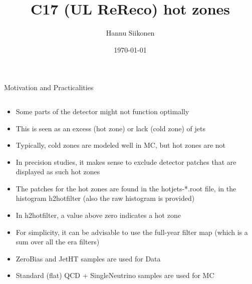 \documentclass[9pt]{beamer}
\title[C17 (UL ReReco) hot zones]{C17 (UL ReReco) hot zones}
\author{Hannu Siikonen}
\institute{Helsinki Institute of Physics \\ \vspace{0.25cm} Instructor Adj.~Prof.~Mikko~Voutilainen}
\date{\today}
\begin{document}
\begin{frame}[t]
\titlepage
\end{frame}

\begin{frame}[t]{Motivation and Practicalities}
\begin{columns}[T]
\begin{column}{\textwidth}
\begin{itemize}
 \item Some parts of the detector might not function optimally
 \item This is seen as an excess (hot zone) or lack (cold zone) of jets
 \item Typically, cold zones are modeled well in MC, but hot zones are not
 \item In precision studies, it makes sense to exclude detector patches that are displayed as such hot zones
 \item The patches for the hot zones are found in the hotjets-*.root file, in the histogram h2hotfilter (also the raw histogram is provided)
 \item In h2hotfilter, a value above zero indicates a hot zone
 \item For simplicity, it can be advisable to use the full-year filter map (which is a sum over all the era filters)
 \item ZeroBias and JetHT samples are used for Data
 \item Standard (flat) QCD + SingleNeutrino samples are used for MC
\end{itemize}
\end{column}
\end{columns}
\end{frame}
\end{document}
